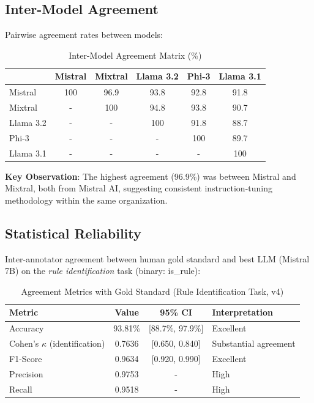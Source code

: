 \subsection{Inter-Model Agreement}

Pairwise agreement rates between models:

\begin{table}[htbp]
\centering
\caption{Inter-Model Agreement Matrix (\%)}
\label{tab:agreement}
\begin{tabular}{lccccc}
\toprule
& \textbf{Mistral} & \textbf{Mixtral} & \textbf{Llama 3.2} & \textbf{Phi-3} & \textbf{Llama 3.1} \\
\midrule
Mistral & 100 & 96.9 & 93.8 & 92.8 & 91.8 \\
Mixtral & - & 100 & 94.8 & 93.8 & 90.7 \\
Llama 3.2 & - & - & 100 & 91.8 & 88.7 \\
Phi-3 & - & - & - & 100 & 89.7 \\
Llama 3.1 & - & - & - & - & 100 \\
\bottomrule
\end{tabular}
\end{table}

\textbf{Key Observation}: The highest agreement (96.9\%) was between Mistral and Mixtral, both from Mistral AI, suggesting consistent instruction-tuning methodology within the same organization.

\subsection{Statistical Reliability}

Inter-annotator agreement between human gold standard and best LLM (Mistral 7B) on the \textit{rule identification} task (binary: is\_rule):

\begin{table}[htbp]
\centering
\caption{Agreement Metrics with Gold Standard (Rule Identification Task, v4)}
\label{tab:agreement-stats}
\begin{tabular}{|l|c|c|l|}
\hline
\textbf{Metric} & \textbf{Value} & \textbf{95\% CI} & \textbf{Interpretation} \\
\hline
Accuracy & 93.81\% & [88.7\%, 97.9\%] & Excellent \\
Cohen's $\kappa$ (identification) & 0.7636 & [0.650, 0.840] & Substantial agreement \\
F1-Score & 0.9634 & [0.920, 0.990] & Excellent \\
Precision & 0.9753 & - & High \\
Recall & 0.9518 & - & High \\
\hline
\end{tabular}
\end{table}


